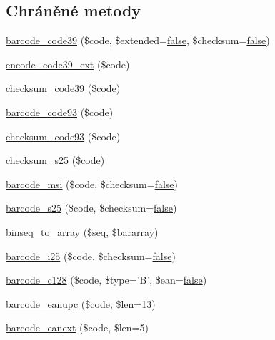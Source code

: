 \subsection*{Chráněné metody}
\begin{DoxyCompactItemize}
\item 
\hyperlink{class_p_d_f_barcode_a877dd4ef9efc505c1f6c64181677cd0c}{barcode\-\_\-code39} (\$code, \$extended=\hyperlink{ttfontsuni_8php_afbaa04e5cc97693dc668b3c45d3dd740}{false}, \$checksum=\hyperlink{ttfontsuni_8php_afbaa04e5cc97693dc668b3c45d3dd740}{false})
\item 
\hyperlink{class_p_d_f_barcode_acbd4c179910ddbe6b550d6c251883b6f}{encode\-\_\-code39\-\_\-ext} (\$code)
\item 
\hyperlink{class_p_d_f_barcode_a9b544efecfb2b169c80fd3aefa6a96ed}{checksum\-\_\-code39} (\$code)
\item 
\hyperlink{class_p_d_f_barcode_ad69ccc862da2e972107db8a4b7dfcf6a}{barcode\-\_\-code93} (\$code)
\item 
\hyperlink{class_p_d_f_barcode_a53c00ee8f26a60d2ab8188c9e8ee91fc}{checksum\-\_\-code93} (\$code)
\item 
\hyperlink{class_p_d_f_barcode_a8f626b282c31cbb01e2f46ec254c81e0}{checksum\-\_\-s25} (\$code)
\item 
\hyperlink{class_p_d_f_barcode_a743d9e4f9cc40b42e35e908449018794}{barcode\-\_\-msi} (\$code, \$checksum=\hyperlink{ttfontsuni_8php_afbaa04e5cc97693dc668b3c45d3dd740}{false})
\item 
\hyperlink{class_p_d_f_barcode_ae7c4ff2d26a41832b8a69e563e0b356e}{barcode\-\_\-s25} (\$code, \$checksum=\hyperlink{ttfontsuni_8php_afbaa04e5cc97693dc668b3c45d3dd740}{false})
\item 
\hyperlink{class_p_d_f_barcode_a8092b1039770f208131fbbf4b33e8753}{binseq\-\_\-to\-\_\-array} (\$seq, \$bararray)
\item 
\hyperlink{class_p_d_f_barcode_a4f15765a723b2fb941e1086f41c61c25}{barcode\-\_\-i25} (\$code, \$checksum=\hyperlink{ttfontsuni_8php_afbaa04e5cc97693dc668b3c45d3dd740}{false})
\item 
\hyperlink{class_p_d_f_barcode_ae6915e2ebbae421aec7156b58bd2f253}{barcode\-\_\-c128} (\$code, \$type='B', \$ean=\hyperlink{ttfontsuni_8php_afbaa04e5cc97693dc668b3c45d3dd740}{false})
\item 
\hyperlink{class_p_d_f_barcode_a8dde55c285a773ed38324193ba0319c2}{barcode\-\_\-eanupc} (\$code, \$len=13)
\item 
\hyperlink{class_p_d_f_barcode_af9dcf3fd71bd07a2bd0ceab21bbadc17}{barcode\-\_\-eanext} (\$code, \$len=5)

\end{DoxyCompactItemize}
